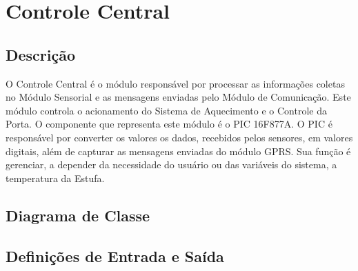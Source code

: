 \documentclass{report}
\begin{document}
    \section{Controle Central}\label{mdCentral}

     \subsection{Descrição}
	  O Controle Central é o módulo responsável por processar as informações coletas no Módulo Sensorial e as mensagens enviadas pelo Módulo de Comunicação. Este módulo controla 
	  o acionamento do Sistema de Aquecimento e o Controle da Porta. O componente que representa este módulo é o PIC 16F877A. O PIC é responsável por converter os valores os dados, 
	  recebidos pelos sensores, em valores digitais, além de capturar as mensagens enviadas do módulo GPRS. Sua função é gerenciar, a depender da necessidade do usuário ou das 
	  variáveis do sistema, a temperatura da Estufa. 
	  
    \subsection{Diagrama de Classe}
	
	\begin{figure}[H]
	  \centering
	  
	\end{figure}

	\subsection{Definições de Entrada e Saída}
	
\end{document}
